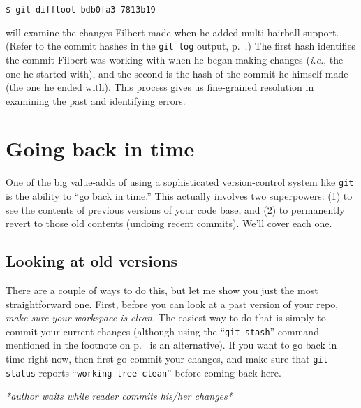 \begin{Verbatim}[fontsize=\small,samepage=true,frame=none]
$ git difftool bdb0fa3 7813b19
\end{Verbatim}

will examine the changes Filbert made when he added multi-hairball support.
(Refer to the commit hashes in the \texttt{git log} output,
p.~\pageref{gitLogOutput}.) The first hash identifies the commit Filbert was
working with when he began making changes (\textit{i.e.}, the one he started
with), and the second is the hash of the commit he himself made (the one he
ended with). This process gives us fine-grained resolution in examining the
past and identifying errors.

\section{Going back in time}


One of the big value-adds of using a sophisticated version-control system like
\texttt{git} is the ability to ``go back in time.'' This actually involves two
superpowers: (1) to see the contents of previous versions of your code base,
and (2) to permanently revert to those old contents (undoing recent commits).
We'll cover each one.

\subsection{Looking at old versions}

There are a couple of ways to do this, but let me show you just the most
straightforward one. First, before you can look at a past version of your repo,
\textit{make sure your workspace is clean.} The easiest way to do that is
simply to commit your current changes (although using the ``\texttt{git
stash}'' command mentioned in the footnote on p.~\pageref{gitStash} is an
alternative). If you want to go back in time right now, then first go commit
your changes, and make sure that \texttt{git status} reports ``\texttt{working
tree clean}'' before coming back here.

\vspace{-.1in}
\begin{center}
\textsl{*author waits while reader commits his/her changes*}
\end{center}
\vspace{-.1in}

